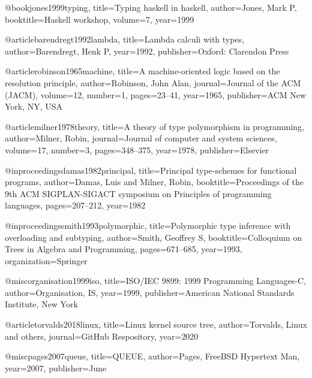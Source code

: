 @book{jones1999typing,
  title={Typing haskell in haskell},
  author={Jones, Mark P},
  booktitle={Haskell workshop},
  volume={7},
  year={1999}
}

@article{barendregt1992lambda,
  title={Lambda calculi with types},
  author={Barendregt, Henk P},
  year={1992},
  publisher={Oxford: Clarendon Press}
}

@article{robinson1965machine,
  title={A machine-oriented logic based on the resolution principle},
  author={Robinson, John Alan},
  journal={Journal of the ACM (JACM)},
  volume={12},
  number={1},
  pages={23--41},
  year={1965},
  publisher={ACM New York, NY, USA}
}

@article{milner1978theory,
  title={A theory of type polymorphism in programming},
  author={Milner, Robin},
  journal={Journal of computer and system sciences},
  volume={17},
  number={3},
  pages={348--375},
  year={1978},
  publisher={Elsevier}
}

@inproceedings{damas1982principal,
  title={Principal type-schemes for functional programs},
  author={Damas, Luis and Milner, Robin},
  booktitle={Proceedings of the 9th ACM SIGPLAN-SIGACT symposium on Principles of programming languages},
  pages={207--212},
  year={1982}
}

@inproceedings{smith1993polymorphic,
  title={Polymorphic type inference with overloading and subtyping},
  author={Smith, Geoffrey S},
  booktitle={Colloquium on Trees in Algebra and Programming},
  pages={671--685},
  year={1993},
  organization={Springer}
}

@misc{organisation1999iso,
  title={ISO/IEC 9899: 1999 Programming Languages-C},
  author={Organisation, IS},
  year={1999},
  publisher={American National Standards Institute, New York}
}

@article{torvalds2018linux,
  title={Linux kernel source tree},
  author={Torvalds, Linux and others},
  journal={GitHub Respository},
  year={2020}
}

@misc{pages2007queue,
  title={QUEUE},
  author={Pages, FreeBSD Hypertext Man},
  year={2007},
  publisher={June}
}
